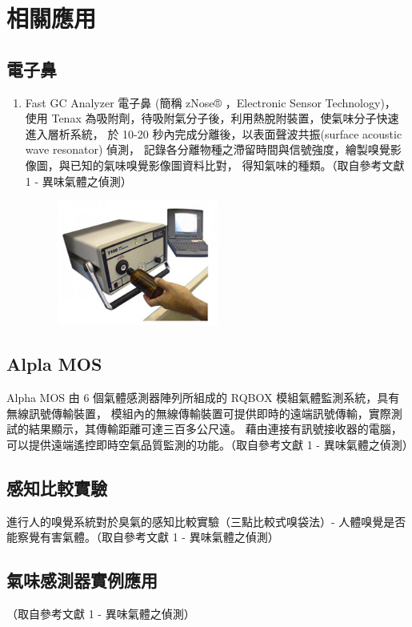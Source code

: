 \chapter{相關應用}

\section{電子鼻}
\begin{enumerate}
	\item 
	Fast GC Analyzer 電子鼻 (簡稱 zNose® ，Electronic Sensor Technology)，
	使用 Tenax 為吸附劑，待吸附氣分子後，利用熱脫附裝置，使氣味分子快速進入層析系統，
	於 10-20 秒內完成分離後，以表面聲波共振(surface acoustic wave resonator) 偵測，
	記錄各分離物種之滯留時間與信號強度，繪製嗅覺影像圖，與已知的氣味嗅覺影像圖資料比對，
	得知氣味的種類。（取自參考文獻 1 - 異味氣體之偵測）
	\begin{figure}[H]
		\centering
		\includegraphics[width=0.5\textwidth]{../../pic/nose.png}
	\end{figure}
\end{enumerate}

\section{Alpla MOS}
Alpha MOS 由 6 個氣體感測器陣列所組成的 RQBOX 模組氣體監測系統，具有無線訊號傳輸裝置，
模組內的無線傳輸裝置可提供即時的遠端訊號傳輸，實際測試的結果顯示，其傳輸距離可達三百多公尺遠。
藉由連接有訊號接收器的電腦，可以提供遠端遙控即時空氣品質監測的功能。（取自參考文獻 1 - 異味氣體之偵測）

\section{感知比較實驗}
進行人的嗅覺系統對於臭氣的感知比較實驗（三點比較式嗅袋法）- 人體嗅覺是否能察覺有害氣體。（取自參考文獻 1 - 異味氣體之偵測）

\section{氣味感測器實例應用}
（取自參考文獻 1 - 異味氣體之偵測）\\

